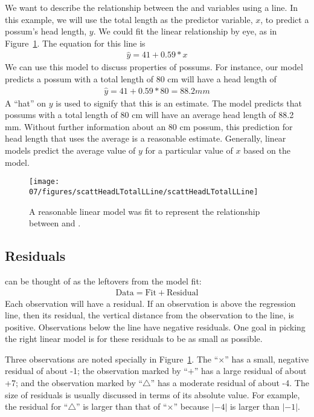 We want to describe the relationship between the  and  variables using a line. In this example, we will use the total length as the predictor variable, $x$, to predict a possum's head length, $y$. We could fit the linear relationship by eye, as in Figure~\ref{scattHeadLTotalLLine}. The equation for this line is
\begin{eqnarray}
\widehat{y} = 41 + 0.59*x
\label{headLLinModTotalL}
\end{eqnarray}
We can use this model to discuss properties of possums. For instance, our model predicts a possum with a total length of 80 cm will have a head length of
\begin{eqnarray*}
\widehat{y} = 41 + 0.59*80 = 88.2 mm
\end{eqnarray*}
A ``hat'' on $y$ is used to signify that this is an estimate. The model predicts that possums with a total length of 80 cm will have an average head length of 88.2 mm. Without further information about an 80 cm possum, this prediction for head length that uses the average is a reasonable estimate. Generally, linear models predict the average value of $y$ for a particular value of $x$ based on the model.
\begin{figure}
   \centering
   \texttt{[image: 07/figures/scattHeadLTotalLLine/scattHeadLTotalLLine]}
   \caption{A reasonable linear model was fit to represent the relationship between  and .}
   \label{scattHeadLTotalLLine}
\end{figure}

\subsection{Residuals}

 can be thought of as the leftovers from the model fit:
\begin{align*}
\text{Data} = \text{Fit} + \text{Residual}
\end{align*}
Each observation will have a residual. If an observation is above the regression line, then its residual, the vertical distance from the observation to the line, is positive. Observations below the line have negative residuals. One goal in picking the right linear model is for these residuals to be as small as possible.

Three observations are noted specially in Figure~\ref{scattHeadLTotalLLine}. The ``$\times$'' has a small, negative residual of about -1; the observation marked by ``$+$'' has a large residual of about +7; and the observation marked by ``$\triangle$'' has a moderate residual of about -4. The size of residuals is usually discussed in terms of its absolute value. For example, the residual for ``$\triangle$'' is larger than that of ``$\times$'' because $|-4|$ is larger than $|-1|$.

